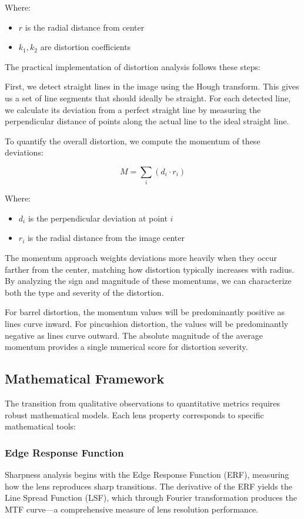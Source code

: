 Where:
\begin{itemize}
    \item \( r \) is the radial distance from center
    \item \( k_1, k_2 \) are distortion coefficients
\end{itemize}

The practical implementation of distortion analysis follows these steps:

First, we detect straight lines in the image using the Hough transform. This gives us a set of line segments that should ideally be straight. For each detected line, we calculate its deviation from a perfect straight line by measuring the perpendicular distance of points along the actual line to the ideal straight line.

To quantify the overall distortion, we compute the momentum of these deviations:

\begin{equation}
M = \sum_{i} \left(d_i \cdot r_i\right)
\end{equation}

Where:
\begin{itemize}
    \item \( d_i \) is the perpendicular deviation at point \( i \)
    \item \( r_i \) is the radial distance from the image center
\end{itemize}

The momentum approach weights deviations more heavily when they occur farther from the center, matching how distortion typically increases with radius. By analyzing the sign and magnitude of these momentums, we can characterize both the type and severity of the distortion.

For barrel distortion, the momentum values will be predominantly positive as lines curve inward. For pincushion distortion, the values will be predominantly negative as lines curve outward. The absolute magnitude of the average momentum provides a single numerical score for distortion severity.

\subsection{Mathematical Framework}
The transition from qualitative observations to quantitative metrics requires robust mathematical models. Each lens property corresponds to specific mathematical tools:

\subsubsection{Edge Response Function}
Sharpness analysis begins with the Edge Response Function (ERF), measuring how the lens reproduces sharp transitions. The derivative of the ERF yields the Line Spread Function (LSF), which through Fourier transformation produces the MTF curve---a comprehensive measure of lens resolution performance.

